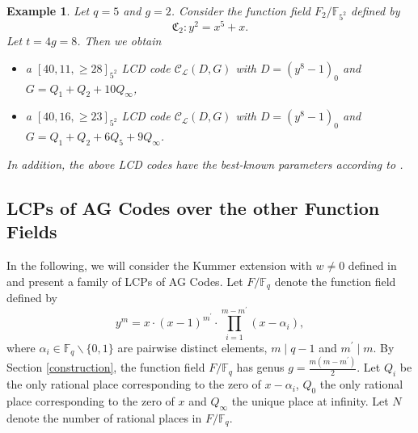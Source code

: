 \documentclass[journal,12pt,onecolumn]{IEEEtran}
\newtheorem{example}[theorem]{Example}
\begin{document}
\begin{example}\label{LCD_HyperEC_ex}
    Let $q = 5$ and $g = 2$. Consider the function field $F_2/\mathbb{F}_{5^2}$ defined by
    \[
        \mathfrak{C}_2: y^2 = x^5+x. 
    \]
    Let $t = 4g =8$. Then we obtain 
    \begin{itemize}
        \item[(1)] a $[40,11,\ge 28]_{5^2}$ LCD code $\mathcal{C}_{\mathcal{L}}(D,G)$ with $D = (y^8-1)_0$ and $G = Q_1+Q_2 + 10 Q_\infty$, 
        \item[(2)] a $[40,16,\ge 23]_{5^2}$ LCD code $\mathcal{C}_{\mathcal{L}}(D,G)$ with $D = (y^8-1)_0$ and $G = Q_1+Q_2 + 6Q_5 + 9 Q_\infty$. 
    \end{itemize}
    In addition, the above LCD codes have the best-known parameters according to \cite{Mint}. 
\end{example}







\subsection{LCPs of AG Codes over the other Function Fields}

In the following, we will consider the Kummer extension with $w\neq0$ defined in \cite{kawakitaKummerCurvesTheir2003a} and present a family of LCPs of AG Codes. Let $F/\mathbb{F}_q$ denote the function field defined by 
\begin{equation}\label{other_F}
    y^m = x \cdot(x-1)^{m^\prime}\cdot\prod_{i = 1}^{m-m^\prime} (x-\alpha_i),
\end{equation}
where $\alpha_i\in\mathbb{F}_q\backslash\{0,1\}$ are pairwise distinct elements, $m\mid q-1$ and $m^\prime\mid m$. By Section \ref{construction}, the function field $F/\mathbb{F}_q$ has genus $g = \frac{m(m-m^\prime)}{2}$. Let $Q_i$ be the only rational place corresponding to the zero of $x-\alpha_i$, $Q_0$ the only rational place corresponding to the zero of $x$ and $Q_\infty$ the unique place at infinity. Let $N$ denote the number of rational places in $F/\mathbb{F}_q$. 
\end{document}
